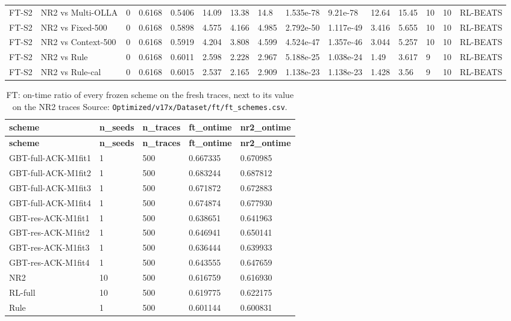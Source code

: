 \documentclass[10pt]{article}
\begin{document}
\begin{landscape}
\begin{longtable}{@{}lllllllllllllll@{}}
FT-S2 & NR2 vs Multi-OLLA & 0 & 0.6168 & 0.5406 & 14.09 & 13.38 & 14.8 & 1.535e-78 & 9.21e-78 & 12.64 & 15.45 & 10 & 10 & RL-BEATS \\
FT-S2 & NR2 vs Fixed-500 & 0 & 0.6168 & 0.5898 & 4.575 & 4.166 & 4.985 & 2.792e-50 & 1.117e-49 & 3.416 & 5.655 & 10 & 10 & RL-BEATS \\
FT-S2 & NR2 vs Context-500 & 0 & 0.6168 & 0.5919 & 4.204 & 3.808 & 4.599 & 4.524e-47 & 1.357e-46 & 3.044 & 5.257 & 10 & 10 & RL-BEATS \\
FT-S2 & NR2 vs Rule & 0 & 0.6168 & 0.6011 & 2.598 & 2.228 & 2.967 & 5.188e-25 & 1.038e-24 & 1.49 & 3.617 & 9 & 10 & RL-BEATS \\
FT-S2 & NR2 vs Rule-cal & 0 & 0.6168 & 0.6015 & 2.537 & 2.165 & 2.909 & 1.138e-23 & 1.138e-23 & 1.428 & 3.56 & 9 & 10 & RL-BEATS \\
\bottomrule
\end{longtable}
\normalsize
\tiny
\setlength{\tabcolsep}{2pt}
\begin{longtable}{@{}lllll@{}}
\caption{FT: on-time ratio of every frozen scheme on the fresh traces, next to its value on the NR2 traces Source: \texttt{Optimized/v17x/Dataset/ft/ft\_schemes.csv}.}\\
\toprule
\textbf{scheme} & \textbf{n\_seeds} & \textbf{n\_traces} & \textbf{ft\_ontime} & \textbf{nr2\_ontime} \\
\midrule
\endfirsthead
\toprule
\textbf{scheme} & \textbf{n\_seeds} & \textbf{n\_traces} & \textbf{ft\_ontime} & \textbf{nr2\_ontime} \\
\midrule
\endhead
GBT-full-ACK-M1fit1 & 1 & 500 & 0.667335 & 0.670985 \\
GBT-full-ACK-M1fit2 & 1 & 500 & 0.683244 & 0.687812 \\
GBT-full-ACK-M1fit3 & 1 & 500 & 0.671872 & 0.672883 \\
GBT-full-ACK-M1fit4 & 1 & 500 & 0.674874 & 0.677930 \\
GBT-res-ACK-M1fit1 & 1 & 500 & 0.638651 & 0.641963 \\
GBT-res-ACK-M1fit2 & 1 & 500 & 0.646941 & 0.650141 \\
GBT-res-ACK-M1fit3 & 1 & 500 & 0.636444 & 0.639933 \\
GBT-res-ACK-M1fit4 & 1 & 500 & 0.643555 & 0.647659 \\
NR2 & 10 & 500 & 0.616759 & 0.616930 \\
RL-full & 10 & 500 & 0.619775 & 0.622175 \\
Rule & 1 & 500 & 0.601144 & 0.600831 \\

\end{longtable}
\end{landscape}
\end{document}
